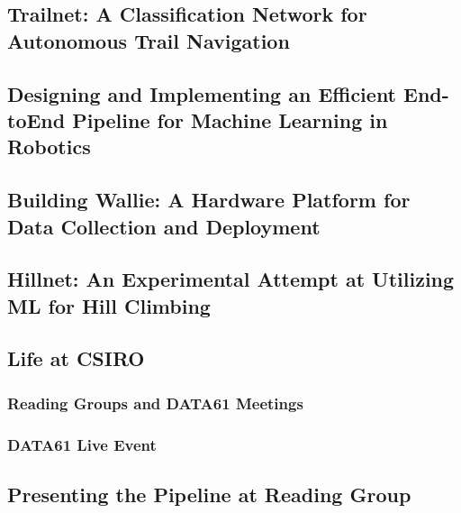 \newpage
\subsection{Trailnet: A Classification Network for Autonomous Trail Navigation}

\newpage
\subsection{Designing and Implementing an Efficient End-toEnd Pipeline for Machine Learning in Robotics}

\newpage
\subsection{Building Wallie: A Hardware Platform for Data Collection and Deployment}

\newpage
\subsection{Hillnet: An Experimental Attempt at Utilizing ML for Hill Climbing}

\newpage
\subsection{Life at CSIRO}

\subsubsection{Reading Groups and DATA61 Meetings}

\subsubsection{DATA61 Live Event}

\newpage
\subsection{Presenting the Pipeline at Reading Group}

